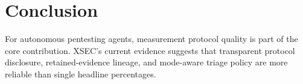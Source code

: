 \documentclass[11pt]{article}
\begin{document}
\section{Conclusion}

For autonomous pentesting agents, measurement protocol quality is part of the
core contribution. XSEC's current evidence suggests that transparent protocol
disclosure, retained-evidence lineage, and mode-aware triage policy are more
reliable than single headline percentages.



\end{document}
